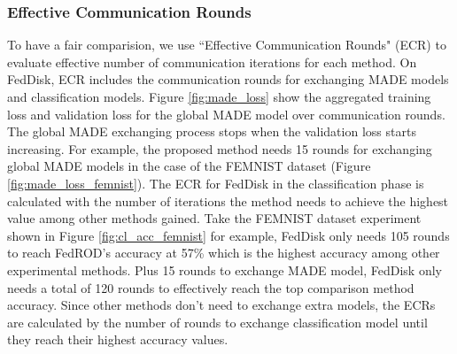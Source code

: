 \documentclass[journal]{IEEEtai}
\newcommand{\MethodnameShort}{FedDisk}
\begin{document}


\subsubsection{Effective Communication Rounds}
To have a fair comparision, we use ``Effective Communication Rounds" (ECR) to evaluate effective number of communication iterations for each method. On \MethodnameShort{}, ECR includes the communication rounds for exchanging MADE models and classification models. Figure \ref{fig:made_loss} show the aggregated training loss and validation loss for the global MADE model over communication rounds. The global MADE exchanging process stops when the validation loss starts increasing. For example, the proposed method needs 15 rounds for exchanging global MADE models in the case of the FEMNIST dataset (Figure \ref{fig:made_loss_femnist}). The ECR for \MethodnameShort{} in the classification phase is calculated with the number of iterations the method needs to achieve the highest value among other methods gained. Take the FEMNIST dataset experiment shown in Figure \ref{fig:cl_acc_femnist} for example, \MethodnameShort{} only needs 105 rounds to reach FedROD's accuracy at 57\% which is the highest accuracy among other experimental methods. Plus 15 rounds to exchange MADE model, \MethodnameShort{} only needs a total of 120 rounds to effectively reach the top comparison method accuracy. Since other methods don't need to exchange extra models, the ECRs are calculated by the number of rounds to exchange classification model until they reach their highest accuracy values. 
\end{document}
